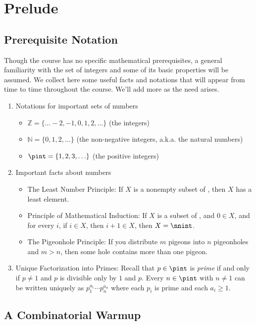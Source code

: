\section{Prelude}

\subsection{Prerequisite Notation}


Though the course has no specific mathematical prerequisites, a general familiarity with the set of integers and some of its basic properties will be assumed. We collect here some useful facts and notations that will appear from time to time throughout the course. We'll add more as the need arises.
\begin{enumerate}
\item 
Notations for important sets of numbers
\begin{itemize}
\item 
$\mathbb{Z} = \{\ldots -2,-1,0,1,2,\ldots\}$ (the integers)
\item 
$\mathbb{N} = \{0,1,2,\ldots\}$ (the non-negative integers, a.k.a. the natural numbers)
\item 
$\pint=\{1,2,3,\ldots\}$ (the positive integers)
\end{itemize}
\item 
Important facts about numbers
\begin{itemize}
\item 
The Least Number Principle: If $X$ is a nonempty subset of \nnint, then $X$ has a least element.
\item 
Principle of Mathematical Induction: If $X$ is a subset of \nnint, and $0\in X$, and for every $i$, if $i\in X$, then $i+1\in X$, then $X=\nnint$.
\item The Pigeonhole Principle: If you distribute $m$ pigeons into $n$ pigeonholes and $m>n$, then some hole contains more than one pigeon.
\end{itemize}
\item Unique Factorization into Primes: Recall that $p\in\pint$ is \emph{prime} if and only if $p\neq1$ and $p$ is divisible only by $1$ and $p$. Every $n\in\pint$ with $n\neq 1$ can be written uniquely as $p_1^{a_1}\cdots p_n^{a_n}$ where each $p_i$ is prime and each $a_i\geq 1$. 
\end{enumerate}

\subsection{A Combinatorial Warmup}

